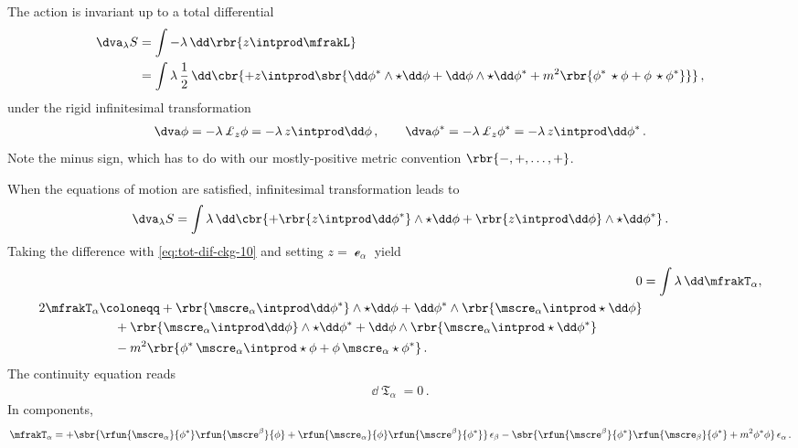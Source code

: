 \documentclass[a4paper]{article}
\begin{document}
The action is invariant up to a total differential
\begin{align}
\dva_{\lambda} S &= \int - \lambda\,\dd\rbr{z \intprod \mfrakL}
\nonumber \\
&= \int \lambda\,\frac{1}{2}\,\dd\cbr{
	+ z\intprod\sbr{\dd\phi^*\wedge\star\dd\phi +
	\dd\phi\wedge\star\dd\phi^* +
	m^2\rbr{\phi^*\,\star\phi
	+\phi\,\star\phi^*}}}\,,
\label{eq:tot-dif-ckg-10}
\end{align}
under the rigid infinitesimal transformation
\begin{align}
\dva\phi = -\lambda\, \pounds_z \phi = -\lambda\, z \intprod \dd \phi\,,\qquad
\dva\phi^* = -\lambda\, \pounds_z \phi^* = -\lambda\, z \intprod \dd \phi^*\,.
\end{align}
Note the minus sign, which has to do with our mostly-positive metric convention 
$\rbr{-, +, \ldots, +}$.

When the equations of motion are satisfied, infinitesimal 
transformation leads to
\begin{align}
\dva_{\lambda} S = \int \lambda\,\dd\cbr{
	+\rbr{z\intprod\dd\phi^*}\wedge\star\dd\phi
	+\rbr{z\intprod\dd\phi}\wedge\star\dd\phi^*}\,.
\end{align}
Taking the difference with \cref{eq:tot-dif-ckg-10} and setting $z = 
\mscre_{\alpha}$ yield
\begin{align}
0 &= \int \lambda\,\dd \mfrakT_{\alpha}, \\
\begin{split}
2 \mfrakT_{\alpha} &\coloneqq
+\rbr{\mscre_{\alpha}\intprod\dd\phi^*}\wedge\star\dd\phi +
\dd\phi^*\wedge\rbr{\mscre_{\alpha}\intprod\star\dd\phi}
\\
&\quad\,+
\rbr{\mscre_{\alpha}\intprod\dd\phi}\wedge\star\dd\phi^* +
\dd\phi\wedge\rbr{\mscre_{\alpha}\intprod\star\dd\phi^*}
\\
&\quad\,-
m^2\rbr{\phi^*\,\mscre_{\alpha}\intprod\star\phi +
	\phi\,\mscre_{\alpha}\star\phi^*}\,.
\end{split}
\end{align}
The continuity equation reads
\begin{align}
\dd \mfrakT_{\alpha} = 0\,.
\end{align}
In components,
\begin{align}
\mfrakT_{\alpha} =
+\sbr{\rfun{\mscre_{\alpha}}{\phi^*} \rfun{\mscre^{\beta}}{\phi}+
	\rfun{\mscre_{\alpha}}{\phi} \rfun{\mscre^{\beta}}{\phi^*}}\,
		\epsilon_{\beta} -
\sbr{\rfun{\mscre^{\beta}}{\phi^*} \rfun{\mscre_{\beta}}{\phi^*}
	+ m^2 \phi^* \phi}\, \epsilon_{\alpha}\,.
\end{align}
\end{document}
